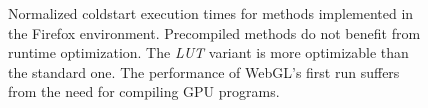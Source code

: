 \begin{figure}

    \label{plot:coldstart-Firefox}
    \caption{Normalized coldstart execution times for methods implemented in the Firefox environment. Precompiled methods do not benefit from runtime optimization. The \textit{LUT} variant is more optimizable than the standard one. The performance of WebGL's first run suffers from the need for compiling GPU programs.}
\end{figure}

